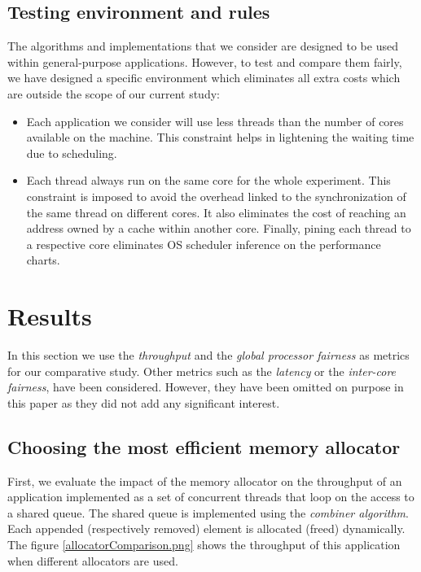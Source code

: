 \documentclass[10pt]{article}											%
\begin{document}
\subsection{Testing environment and rules}
The algorithms and implementations that we consider are designed to be used within general-purpose applications.   However, to test and compare them fairly, we have designed a specific environment which eliminates all extra costs which are outside the scope of our current study:
\begin{itemize}
	\item Each application we consider will use less threads than the number of cores available on the machine.   This constraint helps in lightening the waiting time due to scheduling.
	\item Each thread always run on the same core for the whole experiment.   This constraint is imposed to avoid the overhead linked to the synchronization of the same thread on different cores.   It also eliminates the cost of reaching an address owned by a cache within another core.   Finally, pining each thread to a respective core eliminates OS scheduler inference on the performance charts.
\end{itemize}







\section{Results}
In this section we use the \textit{throughput} and the \textit{global processor fairness} as metrics for our comparative study.   Other metrics such as the \textit{latency} or the \textit{inter-core fairness}, have been considered.   However, they have been omitted on purpose in this paper as they did not add any significant interest.\\



\subsection{Choosing the most efficient memory allocator}
First, we evaluate the impact of the memory allocator on the throughput of an application implemented as a set of concurrent threads that loop on the access to a shared queue.  The shared queue is implemented using the \emph{combiner algorithm}.   Each appended (respectively removed) element is allocated (freed) dynamically.   The figure \ref{allocatorComparison.png} shows the throughput of this application when different allocators are used.
\end{document}
